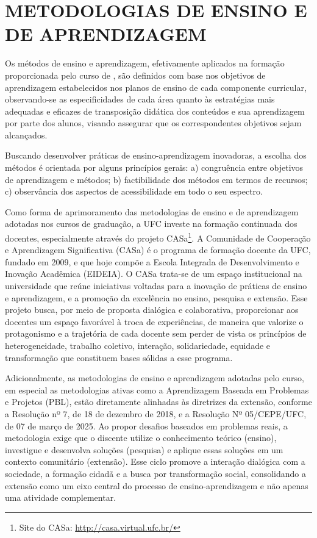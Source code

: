 \chapter{METODOLOGIAS DE ENSINO E DE APRENDIZAGEM}
\label{cap:metodologias-de-ensino}

Os métodos de ensino e aprendizagem, efetivamente aplicados na formação proporcionada pelo curso de \nomedocurso, são definidos com base nos objetivos de aprendizagem estabelecidos nos planos de ensino de cada componente curricular, observando-se as especificidades de cada área quanto às estratégias mais adequadas e eficazes de transposição didática dos conteúdos e sua aprendizagem por parte dos alunos, visando assegurar que os correspondentes objetivos sejam alcançados.

Buscando desenvolver práticas de ensino-aprendizagem inovadoras, a escolha dos métodos é orientada por alguns princípios gerais: a) congruência entre objetivos de aprendizagem e métodos; b) factibilidade dos métodos em termos de recursos; c) observância dos aspectos de acessibilidade em todo o seu espectro.

Como forma de aprimoramento das metodologias de ensino e de aprendizagem adotadas nos cursos de graduação, a UFC investe na formação continuada dos docentes, especialmente através do projeto CASa\footnote{Site do CASa: \url{http://casa.virtual.ufc.br/}}. A Comunidade de Cooperação e Aprendizagem Significativa (CASa) é o programa de formação docente da UFC, fundado em 2009, e que hoje compõe a Escola Integrada de Desenvolvimento e Inovação Acadêmica (EIDEIA). O CASa trata-se de um espaço institucional na universidade que reúne iniciativas voltadas para a inovação de práticas de ensino e aprendizagem, e a promoção da excelência no ensino, pesquisa e extensão. Esse projeto busca, por meio de proposta dialógica e colaborativa, proporcionar aos docentes um espaço favorável à troca de experiências, de maneira que valorize o protagonismo e a trajetória de cada docente sem perder de vista os princípios de heterogeneidade, trabalho coletivo, interação, solidariedade, equidade e transformação que constituem bases sólidas a esse programa.

Adicionalmente, as metodologias de ensino e aprendizagem adotadas pelo curso, em especial as metodologias ativas como a Aprendizagem Baseada em Problemas e Projetos (PBL), estão diretamente alinhadas às diretrizes da extensão, conforme a Resolução nº 7, de 18 de dezembro de 2018, e a Resolução Nº 05/CEPE/UFC, de 07 de março de 2025. Ao propor desafios baseados em problemas reais, a metodologia exige que o discente utilize o conhecimento teórico (ensino), investigue e desenvolva soluções (pesquisa) e aplique essas soluções em um contexto comunitário (extensão). Esse ciclo promove a interação dialógica com a sociedade, a formação cidadã e a busca por transformação social, consolidando a extensão como um eixo central do processo de ensino-aprendizagem e não apenas uma atividade complementar.

